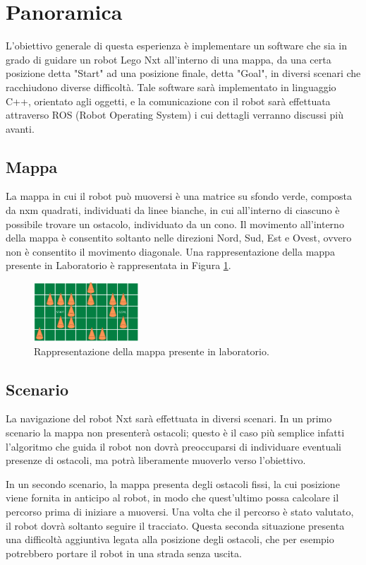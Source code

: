 \documentclass[english]{article}
\begin{document}
\tableofcontents
\newpage

\section{Panoramica}
L'obiettivo generale di questa esperienza è implementare un software che sia in grado di guidare un robot Lego Nxt all'interno di una mappa, da una certa posizione detta "Start" ad una posizione finale, detta "Goal", in diversi scenari che racchiudono diverse difficoltà. Tale software sarà implementato in linguaggio C++, orientato agli oggetti, e la comunicazione con il robot sarà effettuata attraverso ROS (Robot Operating System) i cui dettagli verranno discussi più avanti.

\subsection{Mappa} La mappa in cui il robot può muoversi è una matrice su sfondo verde, composta da nxm quadrati, individuati da linee bianche, in cui all'interno di ciascuno è possibile trovare un ostacolo, individuato da un cono. Il movimento all'interno della mappa è consentito soltanto nelle direzioni Nord, Sud, Est e Ovest, ovvero non è consentito il movimento diagonale. Una rappresentazione della mappa presente in Laboratorio è rappresentata in Figura \ref{fig: mappa_gen}.
\begin{figure}[!h]
\centering
\includegraphics[width=0.35\textwidth]{mappa_generale}
\caption{Rappresentazione della mappa presente in laboratorio.}
\label{fig: mappa_gen}
\end{figure}

\subsection{Scenario} La navigazione del robot Nxt sarà effettuata in diversi scenari. In un primo scenario la mappa non presenterà ostacoli; questo è il caso più semplice infatti l'algoritmo che guida il robot non dovrà preoccuparsi di individuare eventuali presenze di ostacoli, ma potrà liberamente muoverlo verso l'obiettivo. 

In un secondo scenario, la mappa presenta degli ostacoli fissi, la cui posizione viene fornita in anticipo al robot, in modo che quest'ultimo possa calcolare il percorso prima di iniziare a muoversi. Una volta che il percorso è stato valutato, il robot dovrà soltanto seguire il tracciato. Questa seconda situazione presenta una difficoltà aggiuntiva legata alla posizione degli ostacoli, che per esempio potrebbero portare il robot in una strada senza uscita.
\end{document}
